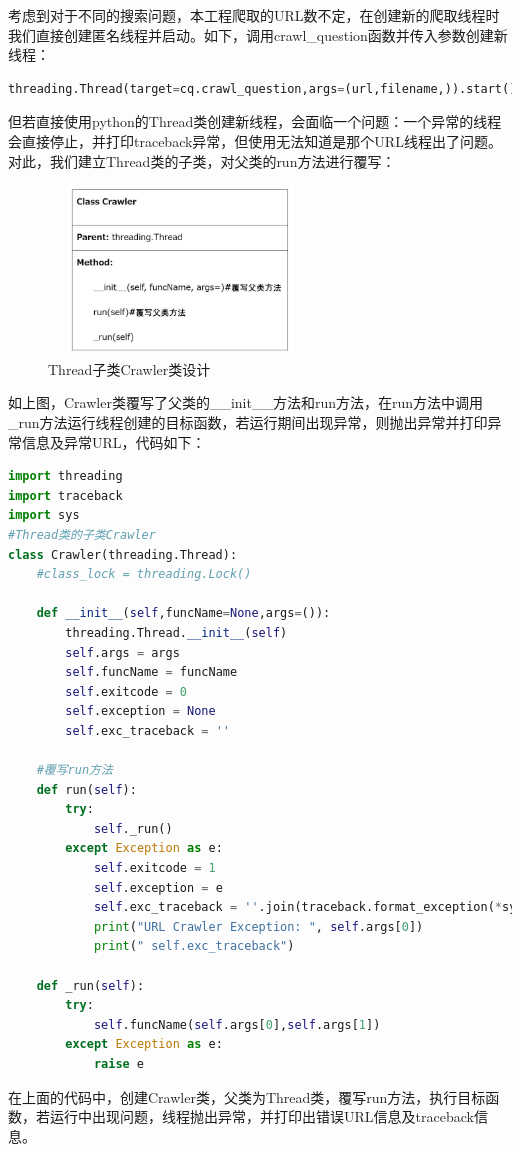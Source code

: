 \documentclass[UTF-8,a4paper, 12pt]{article}
\numberwithin{equation}{section}
\begin{document}
考虑到对于不同的搜索问题，本工程爬取的URL数不定，在创建新的爬取线程时我们直接创建匿名线程并启动。如下，调用crawl\_question函数并传入参数创建新线程：
\begin{lstlisting}[language=python]
threading.Thread(target=cq.crawl_question,args=(url,filename,)).start()
\end{lstlisting}
但若直接使用python的Thread类创建新线程，会面临一个问题：一个异常的线程会直接停止，并打印traceback异常，但使用无法知道是那个URL线程出了问题。对此，我们建立Thread类的子类，对父类的run方法进行覆写：
\begin{figure}[!htbp]
  \centering
  \includegraphics[width=7cm,height=4.5cm]{Thread}
  \caption{Thread子类Crawler类设计}\label{Thread}
\end{figure}
如上图，Crawler类覆写了父类的\_\_init\_\_方法和run方法，在run方法中调用\_run方法运行线程创建的目标函数，若运行期间出现异常，则抛出异常并打印异常信息及异常URL，代码如下：
\begin{lstlisting}[language=python]
import threading
import traceback
import sys
#Thread类的子类Crawler
class Crawler(threading.Thread):
    #class_lock = threading.Lock()

    def __init__(self,funcName=None,args=()):
        threading.Thread.__init__(self)
        self.args = args
        self.funcName = funcName
        self.exitcode = 0
        self.exception = None
        self.exc_traceback = ''
	
    #覆写run方法
    def run(self):
        try:
            self._run()
        except Exception as e:
            self.exitcode = 1
            self.exception = e
            self.exc_traceback = ''.join(traceback.format_exception(*sys.exc_info()))
            print("URL Crawler Exception: ", self.args[0])
            print(" self.exc_traceback")

    def _run(self):
        try:
            self.funcName(self.args[0],self.args[1])
        except Exception as e:
            raise e

\end{lstlisting}
在上面的代码中，创建Crawler类，父类为Thread类，覆写run方法，执行目标函数，若运行中出现问题，线程抛出异常，并打印出错误URL信息及traceback信息。
\end{document}
